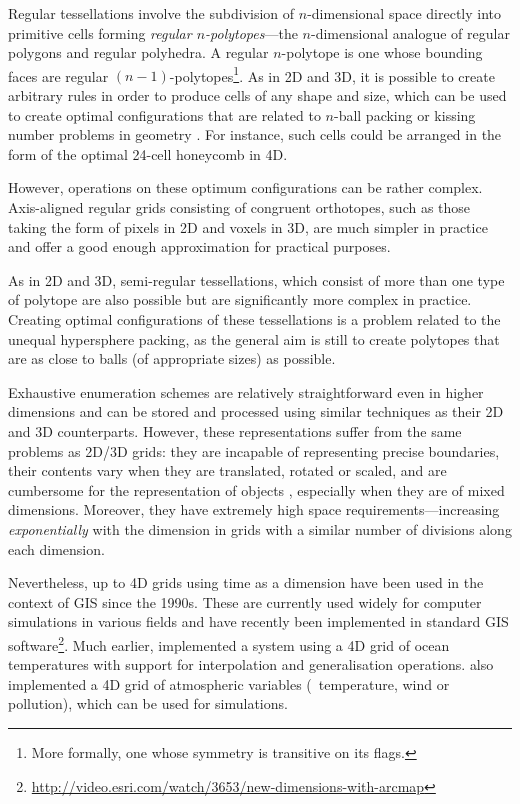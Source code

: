Regular tessellations involve the subdivision of $n$-dimensional space directly into primitive cells forming \emph{regular $n$-polytopes}---the $n$-dimensional analogue of regular polygons and regular polyhedra.
A regular $n$-polytope is one whose bounding faces are regular $(n-1)$-polytopes\footnote{More formally, one whose symmetry is transitive on its flags.}.
As in 2D and 3D, it is possible to create arbitrary rules in order to produce cells of any shape and size, which can be used to create optimal configurations that are related to $n$-ball packing or kissing number problems in geometry \citep{Conway92}.
For instance, such cells could be arranged in the form of the optimal 24-cell honeycomb in 4D.

However, operations on these optimum configurations can be rather complex.
Axis-aligned regular grids consisting of congruent orthotopes, such as those taking the form of pixels in 2D and voxels in 3D, are much simpler in practice and offer a good enough approximation for practical purposes.

As in 2D and 3D, semi-regular tessellations, which consist of more than one type of polytope are also possible but are significantly more complex in practice.
Creating optimal configurations of these tessellations is a problem related to the unequal hypersphere packing, as the general aim is still to create polytopes that are as close to balls (of appropriate sizes) as possible.

Exhaustive enumeration schemes are relatively straightforward even in higher dimensions and can be stored and processed using similar techniques as their 2D and 3D counterparts.
However, these representations suffer from the same problems as 2D/3D grids: they are incapable of representing precise boundaries, their contents vary when they are translated, rotated or scaled, and are cumbersome for the representation of objects \citep{Fisher97}, especially when they are of mixed dimensions.
Moreover, they have extremely high space requirements---increasing \emph{exponentially} with the dimension in grids with a similar number of divisions along each dimension.

Nevertheless, up to 4D grids using time as a dimension have been used in the context of GIS since the 1990s.
These are currently used widely for computer simulations in various fields and have recently been implemented in standard GIS software\footnote{\url{http://video.esri.com/watch/3653/new-dimensions-with-arcmap}}.
Much earlier, \citet{Mason94} implemented a system using a 4D grid of ocean temperatures with support for interpolation and generalisation operations.
\citet{Bernard98} also implemented a 4D grid of atmospheric variables (\eg\ temperature, wind or pollution), which can be used for simulations.

